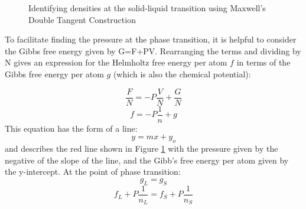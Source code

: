 \documentclass[12pt]{article}
\begin{document}
\begin{figure}[h!]
    \centering
    \caption{Identifying densities at the solid-liquid transition using Maxwell's Double Tangent Construction}
    \label{fig:MaxwellDT}
  \end{figure}

To facilitate finding the pressure at the phase transition, %
it is helpful to consider the Gibbs free energy given by G=F+PV. Rearranging the terms and dividing by N gives an  expression for the Helmholtz free energy per atom $f$ in terms of the Gibbs free energy per atom  $g$ (which is also the chemical potential):  %

\begin{displaymath}{\frac{F}{N}=-P\frac{V}{N}+\frac{G}{N}}\end{displaymath} 
\begin{displaymath}{f=-P\frac{1}{n}+g}\end{displaymath}
\noindent This equation has the form of a line:
\begin{displaymath}{y=mx+y_o}\end{displaymath}
\noindent and describes the red line shown in Figure \ref{fig:MaxwellDT} with the pressure given by the negative of the slope of the line, and the Gibb's free energy per atom given by the y-intercept. At the point of phase transition:
\begin{displaymath}{g_L=g_S}\end{displaymath} 
\begin{displaymath}{f_L+P\frac{1}{n_L}=f_S+P\frac{1}{n_S}}\end{displaymath}
\end{document}
